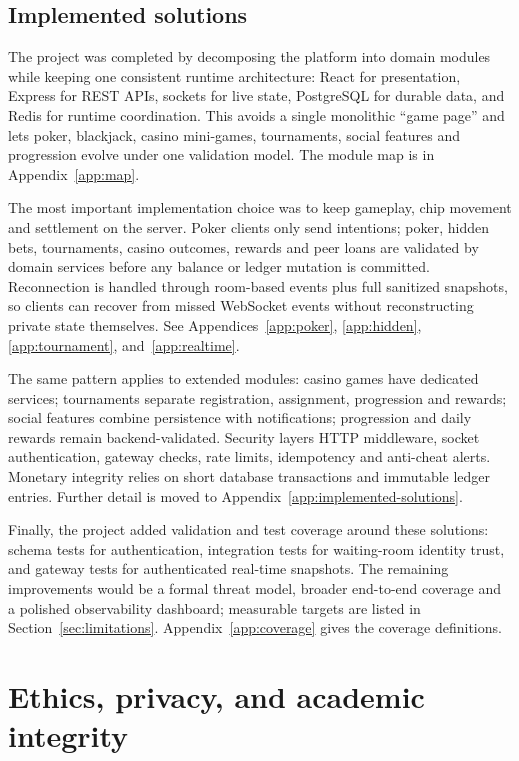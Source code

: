 \documentclass[11pt,a4paper]{article}
\begin{document}
\subsection{Implemented solutions}

The project was completed by decomposing the platform into domain modules while keeping one consistent runtime architecture: React for presentation, Express for REST APIs, sockets for live state, PostgreSQL for durable data, and Redis for runtime coordination. This avoids a single monolithic ``game page'' and lets poker, blackjack, casino mini-games, tournaments, social features and progression evolve under one validation model. The module map is in Appendix~\ref{app:map}.

The most important implementation choice was to keep gameplay, chip movement and settlement on the server. Poker clients only send intentions; poker, hidden bets, tournaments, casino outcomes, rewards and peer loans are validated by domain services before any balance or ledger mutation is committed. Reconnection is handled through room-based events plus full sanitized snapshots, so clients can recover from missed WebSocket events without reconstructing private state themselves. See Appendices~\ref{app:poker}, \ref{app:hidden}, \ref{app:tournament}, and~\ref{app:realtime}.

The same pattern applies to extended modules: casino games have dedicated services; tournaments separate registration, assignment, progression and rewards; social features combine persistence with notifications; progression and daily rewards remain backend-validated. Security layers HTTP middleware, socket authentication, gateway checks, rate limits, idempotency and anti-cheat alerts. Monetary integrity relies on short database transactions and immutable ledger entries. Further detail is moved to Appendix~\ref{app:implemented-solutions}.

Finally, the project added validation and test coverage around these solutions: schema tests for authentication, integration tests for waiting-room identity trust, and gateway tests for authenticated real-time snapshots. The remaining improvements would be a formal threat model, broader end-to-end coverage and a polished observability dashboard; measurable targets are listed in Section~\ref{sec:limitations}. Appendix~\ref{app:coverage} gives the coverage definitions.

\section{Ethics, privacy, and academic integrity}
\label{sec:ethics}
\end{document}
